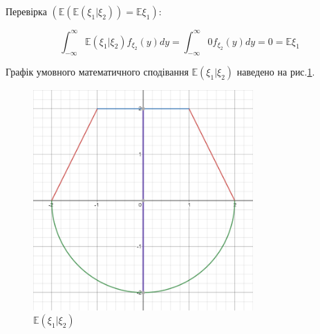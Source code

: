 \documentclass[14pt, a4paper, ukrainian]{extreport}
\begin{document}
 	Перевірка $(\mathbb{E}(\mathbb{E}(\xi_1|\xi_2))=\mathbb{E}\xi_1)$:
 	
 	$$ \int_{-\infty}^{\infty}\mathbb{E}(\xi_1|\xi_2)f_{\xi_2}(y)dy = \int_{-\infty}^{\infty}0f_{\xi_2}(y)dy = 0 = \mathbb{E}\xi_1
 	$$
 	
 	Графік умовного математичного сподівання $\mathbb{E}(\xi_1|\xi_2)$ наведено на рис.\ref{im:Ex|y}.
 	
 	\begin{figure}[H]
 		\centering
 		\includegraphics[width=0.75\textwidth]{./Image/Im_21_E_x_y.png}
 		\caption{$\mathbb{E}(\xi_1|\xi_2)$}
 		\label{im:Ex|y}
 	\end{figure}
 	
\end{document}
